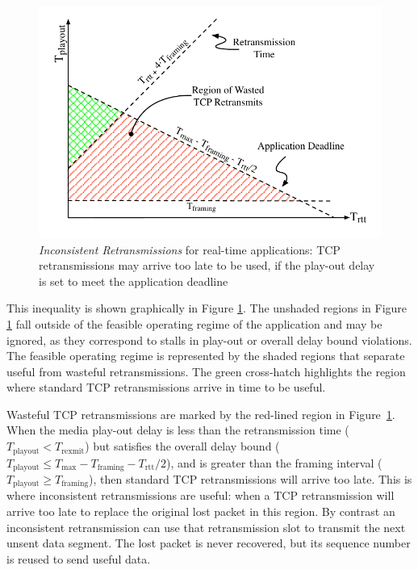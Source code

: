 \begin{figure}[t]
\centering
 \includegraphics[width=\columnwidth]{figures/analysis-delay-region.pdf}
 \caption{\emph{Inconsistent Retransmissions} for real-time applications: TCP
 retransmissions may arrive too late to be used, if the play-out delay is set
  to meet the application deadline}
\label{diagram:inconsistentretrans}
\end{figure}

This inequality is shown graphically in Figure
\ref{diagram:inconsistentretrans}. The unshaded regions in Figure
\ref{diagram:inconsistentretrans} fall outside of the feasible operating regime
of the application and may be ignored, as they correspond to stalls in play-out
or overall delay bound violations.
The feasible operating regime is represented by the shaded regions that separate
useful from wasteful retransmissions. The green cross-hatch highlights the
region where standard TCP retransmissions arrive in time to be useful.

Wasteful TCP retransmissions are marked by the red-lined region in
Figure~\ref{diagram:inconsistentretrans}. When the media play-out delay is less
than the retransmission time ($T_\mathrm{playout} < T_\mathrm{rexmit}$) but
satisfies the overall delay bound ($T_\mathrm{playout} \leq T_\mathrm{max} -
T_\mathrm{framing} - T_\mathrm{rtt}/2$),  and is greater than the framing
interval ($T_\mathrm{playout} \geq T_\mathrm{framing}$), then standard TCP
retransmissions will arrive too late.%
This is where inconsistent retransmissions are useful:
when a TCP retransmission will arrive too late to replace the original lost
packet in this region. By contrast an inconsistent retransmission can use that
retransmission slot to transmit the next unsent data segment. The lost packet is
never recovered, but its sequence number is reused to send useful data.

